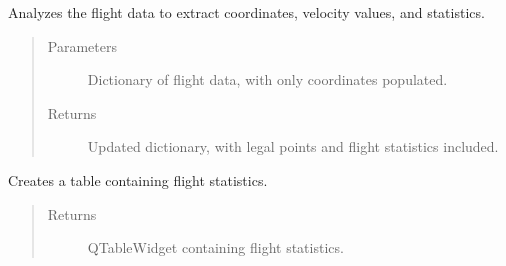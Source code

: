 \documentclass[letterpaper,10pt,english]{sphinxmanual}
\begin{document}
\begin{fulllineitems}
\begin{fulllineitems}
\begin{quote}
\begin{description}
\end{description}\end{quote}

\end{fulllineitems}


\begin{fulllineitems}
\label{\detokenize{index:src.Views.View_ReportScreen.ReportWindow.analyzeFlight}}
Analyzes the flight data to extract coordinates, velocity values, and statistics.
\begin{quote}\begin{description}
\item[{Parameters}] \leavevmode
{} \textendash{} Dictionary of flight data, with only coordinates populated.

\item[{Returns}] \leavevmode
Updated dictionary, with legal points and flight statistics included.

\end{description}\end{quote}

\end{fulllineitems}


\begin{fulllineitems}
\label{\detokenize{index:src.Views.View_ReportScreen.ReportWindow.createStatisticsTable}}
Creates a table containing flight statistics.
\begin{quote}\begin{description}
\item[{Returns}] \leavevmode
QTableWidget containing flight statistics.

\end{description}\end{quote}

\end{fulllineitems}


\end{fulllineitems}
\end{document}
